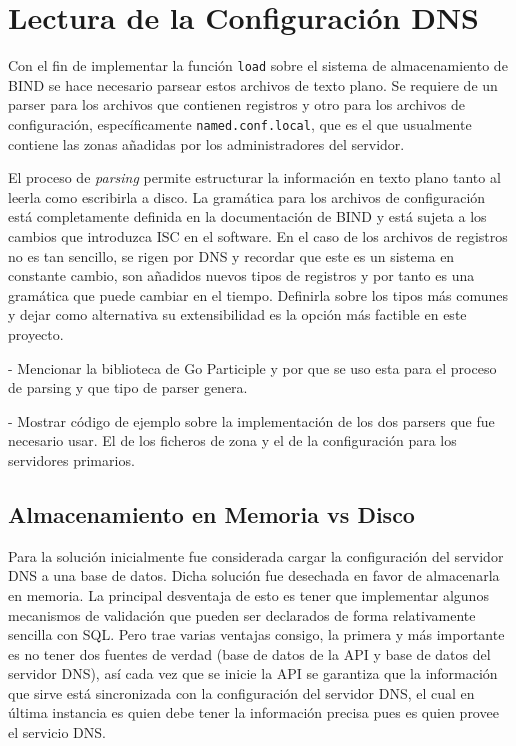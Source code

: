 \section{Lectura de la Configuración DNS}

Con el fin de implementar la función \verb+load+ sobre el sistema de almacenamiento de BIND se hace necesario parsear estos archivos de texto plano. Se requiere de un parser para los archivos que contienen registros y otro para los archivos de configuración, específicamente \verb+named.conf.local+, que es el que usualmente contiene las zonas añadidas por los administradores del servidor.

El proceso de \textit{parsing} permite estructurar la información en texto plano tanto al leerla como escribirla a disco. La gramática para los archivos de configuración está completamente definida en la documentación de BIND y está sujeta a los cambios que introduzca ISC en el software. En el caso de los archivos de registros no es tan sencillo, se rigen por DNS y recordar que este es un sistema en constante cambio, son añadidos nuevos tipos de registros y por tanto es una gramática que puede cambiar en el tiempo. Definirla sobre los tipos más comunes y dejar como alternativa su extensibilidad es la opción más factible en este proyecto.

- Mencionar la biblioteca de Go Participle y por que se uso esta para el proceso de parsing y que tipo de parser genera.

- Mostrar código de ejemplo sobre la implementación de los dos parsers que fue necesario usar. El de los ficheros de zona y el de la configuración para los servidores primarios.

\subsection{Almacenamiento en Memoria vs Disco}

Para la solución inicialmente fue considerada cargar la configuración del servidor DNS a una base de datos. Dicha solución fue desechada en favor de almacenarla en memoria. La principal desventaja de esto es tener que implementar algunos mecanismos de validación que pueden ser declarados de forma relativamente sencilla con SQL. Pero trae varias ventajas consigo, la primera y más importante es no tener dos fuentes de verdad (base de datos de la API y base de datos del servidor DNS), así cada vez que se inicie la API se garantiza que la información que sirve está sincronizada con la configuración del servidor DNS, el cual en última instancia es quien debe tener la información precisa pues es quien provee el servicio DNS.


